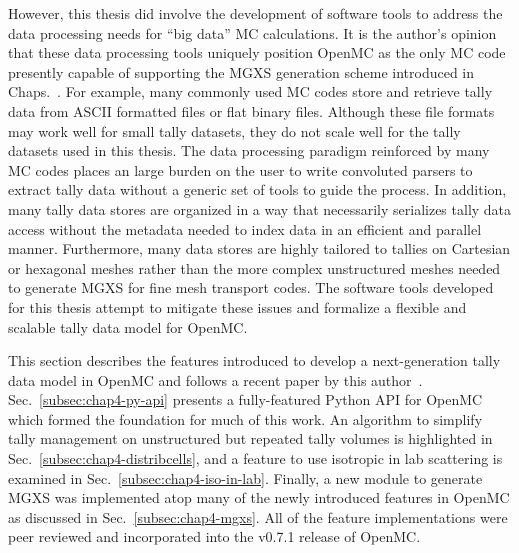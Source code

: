 However, this thesis did involve the development of software tools to address the data processing needs for ``big data'' \ac{MC} calculations. It is the author's opinion that these data processing tools uniquely position OpenMC as the only \ac{MC} code presently capable of supporting the \ac{MGXS} generation scheme introduced in Chaps.~. For example, many commonly used \ac{MC} codes store and retrieve tally data from \ac{ASCII} formatted files or flat binary files. Although these file formats may work well for small tally datasets, they do not scale well for the tally datasets used in this thesis. The data processing paradigm reinforced by many \ac{MC} codes places an large burden on the user to write convoluted parsers to extract tally data without a generic set of tools to guide the process. In addition, many tally data stores are organized in a way that necessarily serializes tally data access without the metadata needed to index data in an efficient and parallel manner. Furthermore, many data stores are highly tailored to tallies on Cartesian or hexagonal meshes rather than the more complex unstructured meshes needed to generate \ac{MGXS} for fine mesh transport codes. The software tools developed for this thesis attempt to mitigate these issues and formalize a flexible and scalable tally data model for OpenMC.



This section describes the features introduced to develop a next-generation tally data model in OpenMC and follows a recent paper by this author~\cite{boyd2016bigdata}. Sec.~\ref{subsec:chap4-py-api} presents a fully-featured Python \ac{API} for OpenMC which formed the foundation for much of this work. An algorithm to simplify tally management on unstructured but repeated tally volumes is highlighted in Sec.~\ref{subsec:chap4-distribcells}, and a feature to use isotropic in lab scattering is examined in Sec.~\ref{subsec:chap4-iso-in-lab}. Finally, a new module to generate \ac{MGXS} was implemented atop many of the newly introduced features in OpenMC as discussed in Sec.~\ref{subsec:chap4-mgxs}. All of the feature implementations were peer reviewed and incorporated into the v0.7.1 release of OpenMC.

